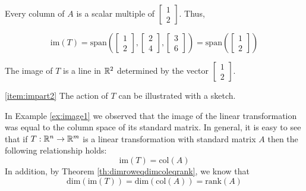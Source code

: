 \documentclass{ximera}
\begin{document}
\begin{example}
\begin{explanation}
Every column of $A$ is a scalar multiple of $\begin{bmatrix}1\\2\end{bmatrix}$.  Thus,
 
$$\mbox{im}(T)=\mbox{span}\left(\begin{bmatrix}1\\2\end{bmatrix}, \begin{bmatrix}2\\4\end{bmatrix}, \begin{bmatrix}3\\6\end{bmatrix}\right)=\mbox{span}\left(\begin{bmatrix}1\\2\end{bmatrix}\right)$$
 
The image of $T$ is a line in $\mathbb{R}^2$ determined by the vector $\begin{bmatrix}1\\2\end{bmatrix}$.
 
\ref{item:impart2} The action of $T$ can be illustrated with a sketch.
 
\begin{center}
\end{center}
\end{explanation}
\end{example}
 
 
In Example \ref{ex:image1} we observed that the image of the linear transformation was equal to the column space of its standard matrix.  In general, it is easy to see that if $T:\mathbb{R}^n\rightarrow \mathbb{R}^m$ is a linear transformation with standard matrix $A$ then the following relationship holds:
$$\mbox{im}(T)=\mbox{col}(A)$$
In addition, by Theorem \ref{th:dimroweqdimcoleqrank}, we know that
$$\mbox{dim}(\mbox{im}(T))=\mbox{dim}(\mbox{col}(A))=\mbox{rank}(A)$$
 
\end{document}
